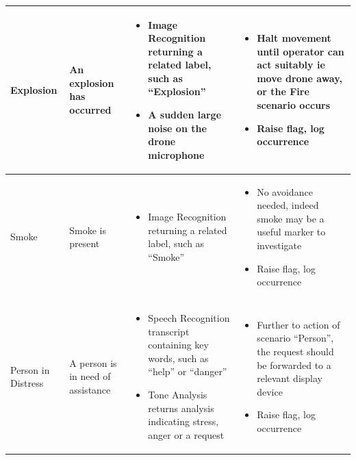 \documentclass{article}
\begin{document}
{\begin{tabular}{| >{\centering\arraybackslash}m{2cm} | >{\centering\arraybackslash}m{2.5cm} | p{5cm} | p{5cm} |}
    Explosion & \vspace{\baselineskip} An explosion has occurred &
    \begin{itemize} [topsep=0pt, leftmargin=0cm,itemindent=.5cm,labelwidth=\itemindent,labelsep=0cm,align=left]
        \item Image Recognition returning a related label, such as “Explosion”
        \item A sudden large noise on the drone microphone
    \end{itemize} &
    \begin{itemize} [topsep=0pt, leftmargin=0cm,itemindent=.5cm,labelwidth=\itemindent,labelsep=0cm,align=left]
        \item Halt movement until operator can act suitably ie move drone away, or the Fire scenario occurs
        \item Raise flag, log occurrence
    \end{itemize} \\ \hline

    Smoke & \vspace{\baselineskip} Smoke is present &
    \begin{itemize} [topsep=0pt, leftmargin=0cm,itemindent=.5cm,labelwidth=\itemindent,labelsep=0cm,align=left]
        \item Image Recognition returning a related label, such as “Smoke”
    \end{itemize} &
    \begin{itemize} [topsep=0pt, leftmargin=0cm,itemindent=.5cm,labelwidth=\itemindent,labelsep=0cm,align=left]
        \item No avoidance needed, indeed smoke may be a useful marker to investigate
        \item Raise flag, log occurrence
    \end{itemize} \\ \hline

    Person in Distress & \vspace{\baselineskip} A person is in need of assistance &
    \begin{itemize} [topsep=0pt, leftmargin=0cm,itemindent=.5cm,labelwidth=\itemindent,labelsep=0cm,align=left]
        \item Speech Recognition transcript containing key words, such as ``help'' or ``danger''
        \item Tone Analysis returns analysis indicating stress, anger or a request
    \end{itemize} &
    \begin{itemize} [topsep=0pt, leftmargin=0cm,itemindent=.5cm,labelwidth=\itemindent,labelsep=0cm,align=left]
        \item Further to action of scenario ``Person'', the request should be forwarded to a relevant display device
        \item Raise flag, log occurrence
    \end{itemize} \\ \hline


\end{tabular}
}
\end{document}
